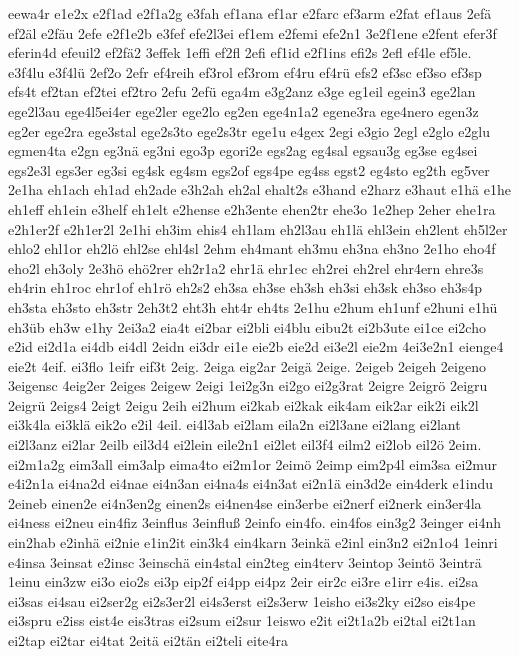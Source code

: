 {eewa4r
e1e2x
e2f1ad
e2f1a2g
e3fah
ef1ana
ef1ar
e2farc
ef3arm
e2fat
ef1aus
2efä
ef2äl
e2fäu
2efe
e2f1e2b
e3fef
efe2l3ei
ef1em
e2femi
efe2n1
3e2f1ene
e2fent
efer3f
eferin4d
efeuil2
ef2fä2
3effek
1effi
ef2fl
2efi
ef1id
e2f1ins
efi2s
2efl
ef4le
ef5le.
e3f4lu
e3f4lü
2ef2o
2efr
ef4reih
ef3rol
ef3rom
ef4ru
ef4rü
efs2
ef3sc
ef3so
ef3sp
efs4t
ef2tan
ef2tei
ef2tro
2efu
2efü
ega4m
e3g2anz
e3ge
eg1eil
egein3
ege2lan
ege2l3au
ege4l5ei4er
ege2ler
ege2lo
eg2en
ege4n1a2
egene3ra
ege4nero
egen3z
eg2er
ege2ra
ege3stal
ege2s3to
ege2s3tr
ege1u
e4gex
2egi
e3gio
2egl
e2glo
e2glu
egmen4ta
e2gn
eg3nä
eg3ni
ego3p
egori2e
egs2ag
eg4sal
egsau3g
eg3se
eg4sei
egs2e3l
egs3er
eg3si
eg4sk
eg4sm
egs2of
egs4pe
eg4ss
egst2
eg4sto
eg2th
eg5ver
2e1ha
eh1ach
eh1ad
eh2ade
e3h2ah
eh2al
ehalt2s
e3hand
e2harz
e3haut
e1hä
e1he
eh1eff
eh1ein
e3helf
eh1elt
e2hense
e2h3ente
ehen2tr
ehe3o
1e2hep
2eher
ehe1ra
e2h1er2f
e2h1er2l
2e1hi
eh3im
ehis4
eh1lam
eh2l3au
eh1lä
ehl3ein
eh2lent
eh5l2er
ehlo2
ehl1or
eh2lö
ehl2se
ehl4sl
2ehm
eh4mant
eh3mu
eh3na
eh3no
2e1ho
eho4f
eho2l
eh3oly
2e3hö
ehö2rer
eh2r1a2
ehr1ä
ehr1ec
eh2rei
eh2rel
ehr4ern
ehre3s
eh4rin
eh1roc
ehr1of
eh1rö
eh2s2
eh3sa
eh3se
eh3sh
eh3si
eh3sk
eh3so
eh3s4p
eh3sta
eh3sto
eh3str
2eh3t2
eht3h
eht4r
eh4ts
2e1hu
e2hum
eh1unf
e2huni
e1hü
eh3üb
eh3w
e1hy
2ei3a2
eia4t
ei2bar
ei2bli
ei4blu
eibu2t
ei2b3ute
ei1ce
ei2cho
e2id
ei2d1a
ei4db
ei4dl
2eidn
ei3dr
ei1e
eie2b
eie2d
ei3e2l
eie2m
4ei3e2n1
eienge4
eie2t
4eif.
ei3flo
1eifr
eif3t
2eig.
2eiga
eig2ar
2eigä
2eige.
2eigeb
2eigeh
2eigeno
3eigensc
4eig2er
2eiges
2eigew
2eigi
1ei2g3n
ei2go
ei2g3rat
2eigre
2eigrö
2eigru
2eigrü
2eigs4
2eigt
2eigu
2eih
ei2hum
ei2kab
ei2kak
eik4am
eik2ar
eik2i
eik2l
ei3k4la
ei3klä
eik2o
e2il
4eil.
ei4l3ab
ei2lam
eila2n
ei2l3ane
ei2lang
ei2lant
ei2l3anz
ei2lar
2eilb
eil3d4
ei2lein
eile2n1
ei2let
eil3f4
eilm2
ei2lob
eil2ö
2eim.
ei2m1a2g
eim3all
eim3alp
eima4to
ei2m1or
2eimö
2eimp
eim2p4l
eim3sa
ei2mur
e4i2n1a
ei4na2d
ei4nae
ei4n3an
ei4na4s
ei4n3at
ei2n1ä
ein3d2e
ein4derk
e1indu
2eineb
einen2e
ei4n3en2g
einen2s
ei4nen4se
ein3erbe
ei2nerf
ei2nerk
ein3er4la
ei4ness
ei2neu
ein4fiz
3einflus
3einfluß
2einfo
ein4fo.
ein4fos
ein3g2
3einger
ei4nh
ein2hab
e2inhä
ei2nie
e1in2it
ein3k4
ein4karn
3einkä
e2inl
ein3n2
ei2n1o4
1einri
e4insa
3einsat
e2insc
3einschä
ein4stal
ein2teg
ein4terv
3eintop
3eintö
3einträ
1einu
ein3zw
ei3o
eio2s
ei3p
eip2f
ei4pp
ei4pz
2eir
eir2c
ei3re
e1irr
e4is.
ei2sa
ei3sas
ei4sau
ei2ser2g
ei2s3er2l
ei4s3erst
ei2s3erw
1eisho
ei3s2ky
ei2so
eis4pe
ei3spru
e2iss
eist4e
eis3tras
ei2sum
ei2sur
1eiswo
e2it
ei2t1a2b
ei2tal
ei2t1an
ei2tap
ei2tar
ei4tat
2eitä
ei2tän
ei2teli
eite4ra
}
